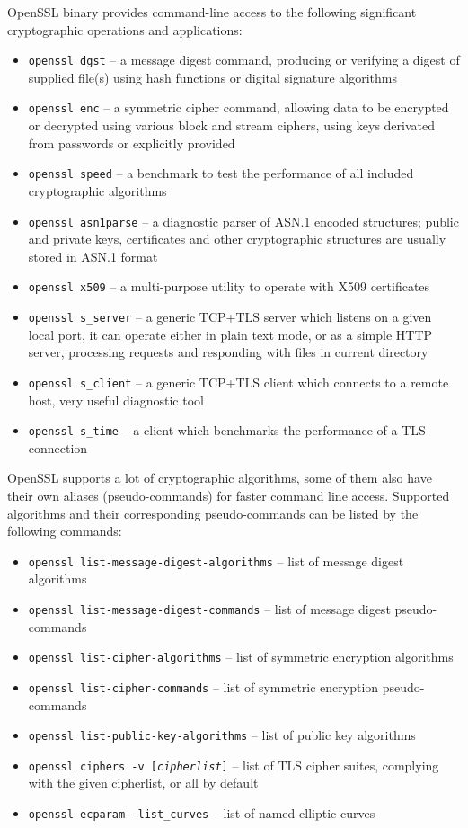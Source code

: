 OpenSSL binary provides command-line access to the following significant cryptographic operations and applications:

\begin{itemize}
  \item \texttt{openssl dgst} -- a message digest command, producing or verifying a digest of supplied file(s) using hash functions or digital signature algorithms
  \item \texttt{openssl enc} -- a symmetric cipher command, allowing data to be encrypted or decrypted using various block and stream ciphers, using keys derivated from passwords or explicitly provided
  \item \texttt{openssl speed} -- a benchmark to test the performance of all included cryptographic algorithms
  \item \texttt{openssl asn1parse} -- a diagnostic parser of ASN.1 encoded structures; public and private keys, certificates and other cryptographic structures are usually stored in ASN.1 format
  \item \texttt{openssl x509} -- a multi-purpose utility to operate with X509 certificates
  \item \texttt{openssl s\_server} -- a generic TCP+TLS server which listens on a given local port, it can operate either in plain text mode, or as a simple HTTP server, processing requests and responding with files in current directory
  \item \texttt{openssl s\_client} -- a generic TCP+TLS client which connects to a remote host, very useful diagnostic tool
  \item \texttt{openssl s\_time} -- a client which benchmarks the performance of a TLS connection
\end{itemize}

OpenSSL supports a lot of cryptographic algorithms, some of them also have their own aliases (pseudo-commands) for faster command line access. Supported algorithms and their corresponding pseudo-commands can be listed by the following commands:

\begin{itemize}
  \item \texttt{openssl list-message-digest-algorithms} -- list of message digest algorithms
  \item \texttt{openssl list-message-digest-commands} -- list of message digest pseudo-commands
  \item \texttt{openssl list-cipher-algorithms} -- list of symmetric encryption algorithms
  \item \texttt{openssl list-cipher-commands} -- list of symmetric encryption pseudo-commands
  \item \texttt{openssl list-public-key-algorithms} -- list of public key algorithms
  \item \texttt{openssl ciphers -v [\textit{cipherlist}]} -- list of TLS cipher suites, complying with the given cipherlist, or all by default
  \item \texttt{openssl ecparam -list\_curves} -- list of named elliptic curves
\end{itemize}


